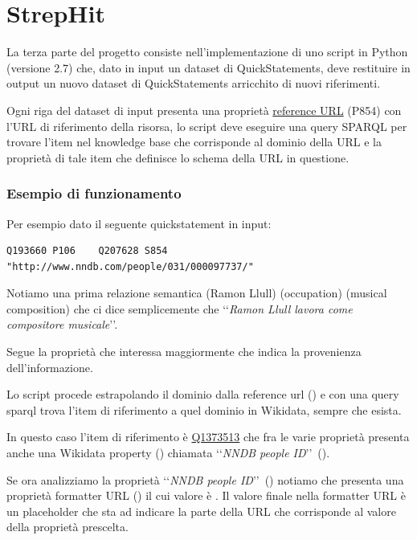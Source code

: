 \chapter{StrepHit}
\label{cha:strephit}
La terza parte del progetto consiste nell'implementazione di uno script in Python (versione 2.7) che, dato in input un dataset di QuickStatements, deve restituire in output un nuovo dataset
di QuickStatements arricchito di nuovi riferimenti.

Ogni riga del dataset di input presenta una proprietà \href{https://www.wikidata.org/wiki/Property:P854}{reference URL} (P854) con l'URL di riferimento della risorsa, lo 
script deve eseguire una query SPARQL per trovare l'item nel knowledge base che corrisponde al dominio della URL e la proprietà di tale item che definisce lo schema della URL in questione.

\subsection{Esempio di funzionamento}
Per esempio dato il seguente quickstatement in input:
\begin{lstlisting}[style=QuickstatementsStyle, caption=Riga del dump]
    Q193660	P106	Q207628	S854	"http://www.nndb.com/people/031/000097737/"
\end{lstlisting}

Notiamo una prima relazione semantica 
\href{https://www.wikidata.org/wiki/Q193660}{} (Ramon Llull) \href{https://www.wikidata.org/wiki/Property:P106}{} (occupation) 
\href{https://www.wikidata.org/wiki/Q207628}{} (musical composition) 
che ci dice semplicemente che \lq\lq \textit{Ramon Llull lavora come compositore musicale}\rq\rq .

Segue la proprietà che interessa maggiormente  che indica la provenienza dell'informazione. 

Lo script procede estrapolando il dominio dalla reference url () e con una query sparql trova l'item di riferimento a quel dominio in Wikidata, sempre che esista.

In questo caso l'item di riferimento è \href{https://www.wikidata.org/wiki/Q1373513}{Q1373513} che fra le varie proprietà presenta anche una Wikidata property () chiamata  
\lq\lq \textit{NNDB people ID}\rq\rq\ ().

Se ora analizziamo la proprietà \lq\lq \textit{NNDB people ID}\rq\rq\ () notiamo che presenta una proprietà formatter URL () il cui valore è . 
Il valore finale  nella formatter URL è un placeholder che sta ad indicare la parte della URL che corrisponde al valore della proprietà prescelta. 

